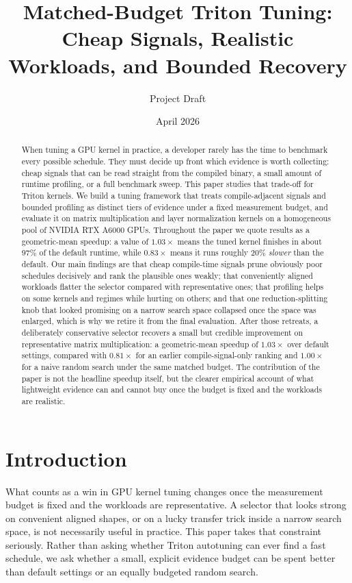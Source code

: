 \documentclass[10pt,twocolumn]{article}
\title{Matched-Budget Triton Tuning: Cheap Signals, Realistic Workloads, and Bounded Recovery}
\author{Project Draft}
\date{April 2026}
\begin{document}
\maketitle

\begin{abstract}
When tuning a GPU kernel in practice, a developer rarely has the time to benchmark every possible schedule. They must decide up front which evidence is worth collecting: cheap signals that can be read straight from the compiled binary, a small amount of runtime profiling, or a full benchmark sweep. This paper studies that trade-off for Triton kernels. We build a tuning framework that treats compile-adjacent signals and bounded profiling as distinct tiers of evidence under a fixed measurement budget, and evaluate it on matrix multiplication and layer normalization kernels on a homogeneous pool of NVIDIA RTX A6000 GPUs. Throughout the paper we quote results as a geometric-mean speedup: a value of $1.03\times$ means the tuned kernel finishes in about $97\%$ of the default runtime, while $0.83\times$ means it runs roughly $20\%$ \emph{slower} than the default. Our main findings are that cheap compile-time signals prune obviously poor schedules decisively and rank the plausible ones weakly; that conveniently aligned workloads flatter the selector compared with representative ones; that profiling helps on some kernels and regimes while hurting on others; and that one reduction-splitting knob that looked promising on a narrow search space collapsed once the space was enlarged, which is why we retire it from the final evaluation. After those retreats, a deliberately conservative selector recovers a small but credible improvement on representative matrix multiplication: a geometric-mean speedup of $1.03\times$ over default settings, compared with $0.81\times$ for an earlier compile-signal-only ranking and $1.00\times$ for a naive random search under the same matched budget. The contribution of the paper is not the headline speedup itself, but the clearer empirical account of what lightweight evidence can and cannot buy once the budget is fixed and the workloads are realistic.
\end{abstract}

\section{Introduction}

What counts as a win in GPU kernel tuning changes once the measurement budget is fixed and the workloads are representative. A selector that looks strong on convenient aligned shapes, or on a lucky transfer trick inside a narrow search space, is not necessarily useful in practice. This paper takes that constraint seriously. Rather than asking whether Triton autotuning can ever find a fast schedule, we ask whether a small, explicit evidence budget can be spent better than default settings or an equally budgeted random search.
\end{document}
